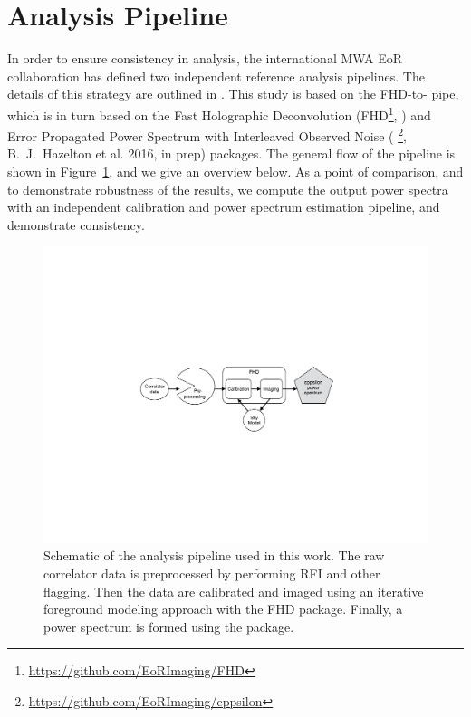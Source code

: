 \documentclass[iop]{emulateapj}
\begin{document}
\section{Analysis Pipeline}\label{sec:analysis}
In order to ensure consistency in analysis, the international MWA EoR collaboration has 
defined two independent reference analysis pipelines. The details of this strategy are 
outlined in \citealt{Jacobs:2016}. This study is based on the FHD-to-\eppsilon 
pipe, which is in turn based on the Fast Holographic Deconvolution 
(FHD\footnote{\url{https://github.com/EoRImaging/FHD}}, \citealt{Sullivan:2012}) and Error 
Propagated Power Spectrum with Interleaved Observed Noise (\eppsilon
\footnote{\url{https://github.com/EoRImaging/eppsilon}}, B.~J.~Hazelton et al. 2016, in 
prep) packages. The general flow of the pipeline is shown in Figure~\ref{fig:pipe}, and we 
give an overview below. As a point of comparison, and to demonstrate robustness of the results, we compute the output power spectra with an independent calibration and power spectrum estimation pipeline, and demonstrate consistency.

\begin{figure}
\begin{center}
\includegraphics[width=\columnwidth]{pipe.pdf}
\caption[Pipeline diagram]{
Schematic of the analysis pipeline used in this work. The raw correlator data is 
preprocessed by performing RFI and other flagging. Then the data are calibrated and 
imaged using an iterative foreground modeling approach with the FHD package. Finally, a 
power spectrum is formed using the \eppsilon package.
\label{fig:pipe}
}
\end{center}
\end{figure}
\end{document}
